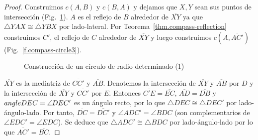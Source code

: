 \begin{proof}
Construimos $c(A,B)$ y $c(B,A)$ y dejamos que $X,Y$ sean sus puntos de intersección (Fig.~\ref{f.compass-circle1}). $A$ es el reflejo de $B$ alrededor de $\overline{XY}$ ya que $\triangle YAX\cong \triangle YBX$ por lado-lateral. Por Teorema~\ref{thm.compass-reflection} construimos $C'$, el reflejo de $C$ alrededor de $\overline{XY}$ y luego construimos $c(A,\overline{AC'})$ (Fig.~\ref{f.compass-circle3}).

\begin{figure}[b]
\begin{center}
\end{center}
\caption{Construcción de un círculo de radio determinado (1)}\label{f.compass-circle1}
\end{figure}

$\overline{XY}$ es la mediatriz de $\overline{CC'}$ y $\overline{AB}$. Denotemos la intersección de $\overline{XY}$ y $\overline{AB}$ por $D$ y la intersección de $\overline{XY}$ y $\overline{CC'}$ por $E$. Entonces $\overline{C'E}=\overline{EC}$, $\overline{AD}=\overline{DB}$ y $\\angle DEC=\angle DEC'$ es un ángulo recto, por lo que $\triangle DEC\cong\triangle DEC'$ por lado-ángulo-lado. Por tanto, $\overline{DC}=\overline{DC'}$ y $\angle ADC'=\angle BDC$ (son complementarios de $\angle EDC'=\angle EDC$). Se deduce que $\triangle ADC'\cong\triangle BDC$ por lado-ángulo-lado por lo que $\overline{AC'}=\overline{BC}$.
\end{proof}

